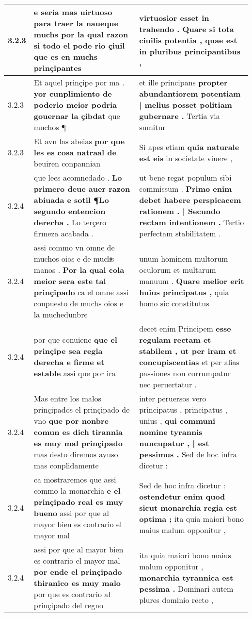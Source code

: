 \begin{tabular}{|p{1cm}|p{6.5cm}|p{6.5cm}|}
3.2.3 & e seria mas uirtuoso para traer la \textbf{ naueque muchs por la qual razon si todo el pode rio çiuil } que es en muchs prinçipantes & virtuosior esset in trahendo . \textbf{ Quare si tota ciuilis potentia , } quae est in pluribus principantibus , \\\hline
3.2.3 & Et aquel prinçipe por ma . \textbf{ yor cunplimiento de poderio meior podria gouernar la çibdat } que muchos ¶ & et ille principans \textbf{ propter abundantiorem potentiam | melius posset politiam gubernare . } Tertia via sumitur \\\hline
3.2.3 & Et avn las abeias \textbf{ por que les es cosa natraal de } beuiren conpannian & Si apes etiam \textbf{ quia naturale est eis } in societate viuere , \\\hline
3.2.4 & que lees acomnedado . \textbf{ Lo primero deue auer razon abiuada e sotil ¶Lo segundo entencion derecha . } Lo terçero firmeza acabada . & ut bene regat populum sibi commissum . \textbf{ Primo enim debet habere perspicacem rationem . | Secundo rectam intentionem . } Tertio perfectam stabilitatem . \\\hline
3.2.4 & assi commo vn omne de muchos oios e de muchͣs manos . \textbf{ Por la qual cola meior sera este tal prinçipado } ca el omne assi conpuesto de muchs oios e la muchedunbre & unum hominem multorum oculorum et multarum manuum . \textbf{ Quare melior erit huius principatus , } quia homo sic constitutus \\\hline
3.2.4 & por que conuiene \textbf{ que el prinçipe sea regla derecha e firme et estable } assi que por ira & decet enim Principem \textbf{ esse regulam rectam et stabilem , ut per iram et concupiscentias } et per alias passiones non corrumpatur nec peruertatur . \\\hline
3.2.4 & Mas entre los malos prinçipados el prinçipado de vno \textbf{ que por nonbre comun es dich tirannia es muy mal prinçipado } mas desto diremos ayuso mas conplidamente & inter peruersos vero principatus , principatus , unius , \textbf{ qui communi nomine tyrannis nuncupatur , | est pessimus . } Sed de hoc infra dicetur : \\\hline
3.2.4 & ca mostraremos que assi commo la monarchia \textbf{ e el prinçipado real es muy bueno } assi por que al mayor bien es contrario el mayor mal & Sed de hoc infra dicetur : \textbf{ ostendetur enim quod sicut monarchia regia est optima ; } ita quia maiori bono maius malum opponitur , \\\hline
3.2.4 & assi por que al mayor bien es contrario el mayor mal \textbf{ por ende el prinçipado thiranico es muy malo } por que es contrario al prinçipado del regno & ita quia maiori bono maius malum opponitur , \textbf{ monarchia tyrannica est pessima . } Dominari autem plures dominio recto , \\\hline

\end{tabular}
